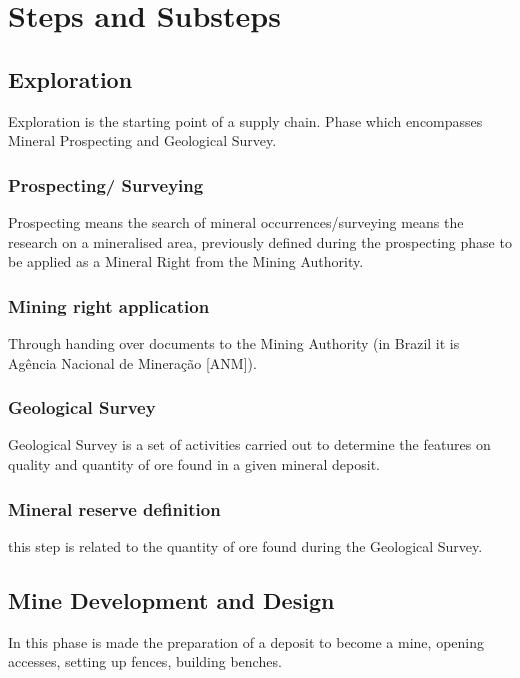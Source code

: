 \section{Steps and Substeps}\label{sec:stepsAndSubsteps}

\subsection{Exploration}\label{sec:Exploration}
Exploration is the starting point of a supply chain. Phase which encompasses Mineral Prospecting and Geological Survey.

\subsubsection{Prospecting/ Surveying}\label{sec:Prospecting}
Prospecting means the search of mineral occurrences/surveying means the research on a mineralised area, previously defined during the prospecting phase to be applied as a Mineral Right from the Mining Authority.

\subsubsection{Mining right application}\label{sec:Mining}
Through handing over documents to the Mining Authority (in Brazil it is Agência Nacional de Mineração [ANM]).

\subsubsection{Geological Survey}\label{sec:GeologicalSurvey}
Geological Survey is a set of activities carried out to determine the features on quality and quantity of ore found in a given mineral deposit.

\subsubsection{Mineral reserve definition}\label{sec:MineralReserve}
this step is related to the quantity of ore found during the Geological Survey.

\subsection{Mine Development and Design}\label{sec:MineDevelopment}
In this phase is made the preparation of a deposit to become a mine, opening accesses, setting up fences, building benches.


